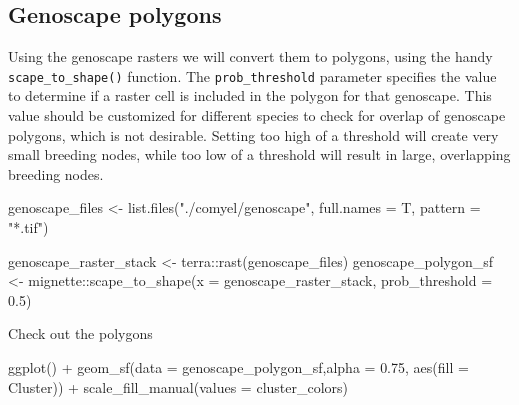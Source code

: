 \documentclass[
]{book}
\newenvironment{Shaded}{\begin{snugshade}}{\end{snugshade}}
\newcommand{\AttributeTok}[1]{\textcolor[rgb]{0.77,0.63,0.00}{#1}}
\newcommand{\FloatTok}[1]{\textcolor[rgb]{0.00,0.00,0.81}{#1}}
\newcommand{\FunctionTok}[1]{\textcolor[rgb]{0.00,0.00,0.00}{#1}}
\newcommand{\NormalTok}[1]{#1}
\newcommand{\OtherTok}[1]{\textcolor[rgb]{0.56,0.35,0.01}{#1}}
\newcommand{\SpecialCharTok}[1]{\textcolor[rgb]{0.00,0.00,0.00}{#1}}
\newcommand{\StringTok}[1]{\textcolor[rgb]{0.31,0.60,0.02}{#1}}
\begin{document}
\hypertarget{genoscape-polygons}{%
\subsection{Genoscape polygons}\label{genoscape-polygons}}

Using the genoscape rasters we will convert them to polygons, using the handy \texttt{scape\_to\_shape()} function. The \texttt{prob\_threshold} parameter specifies the value to determine if a raster cell is included in the polygon for that genoscape. This value should be customized for different species to check for overlap of genoscape polygons, which is not desirable. Setting too high of a threshold will create very small breeding nodes, while too low of a threshold will result in large, overlapping breeding nodes.

\begin{Shaded}
\begin{Highlighting}[]
\NormalTok{genoscape\_files }\OtherTok{\textless{}{-}} \FunctionTok{list.files}\NormalTok{(}\StringTok{"./comyel/genoscape"}\NormalTok{, }
                                     \AttributeTok{full.names =}\NormalTok{ T,}
                                     \AttributeTok{pattern =} \StringTok{"*.tif"}\NormalTok{)}

\NormalTok{genoscape\_raster\_stack }\OtherTok{\textless{}{-}}\NormalTok{ terra}\SpecialCharTok{::}\FunctionTok{rast}\NormalTok{(genoscape\_files)}
\NormalTok{genoscape\_polygon\_sf }\OtherTok{\textless{}{-}}\NormalTok{ mignette}\SpecialCharTok{::}\FunctionTok{scape\_to\_shape}\NormalTok{(}\AttributeTok{x =}\NormalTok{ genoscape\_raster\_stack, }\AttributeTok{prob\_threshold =} \FloatTok{0.5}\NormalTok{)}
\end{Highlighting}
\end{Shaded}

Check out the polygons

\begin{Shaded}
\begin{Highlighting}[]
\FunctionTok{ggplot}\NormalTok{() }\SpecialCharTok{+}
  \FunctionTok{geom\_sf}\NormalTok{(}\AttributeTok{data =}\NormalTok{ genoscape\_polygon\_sf,}\AttributeTok{alpha =} \FloatTok{0.75}\NormalTok{, }\FunctionTok{aes}\NormalTok{(}\AttributeTok{fill =}\NormalTok{ Cluster)) }\SpecialCharTok{+}
  \FunctionTok{scale\_fill\_manual}\NormalTok{(}\AttributeTok{values =}\NormalTok{ cluster\_colors)}
\end{Highlighting}
\end{Shaded}
\end{document}
